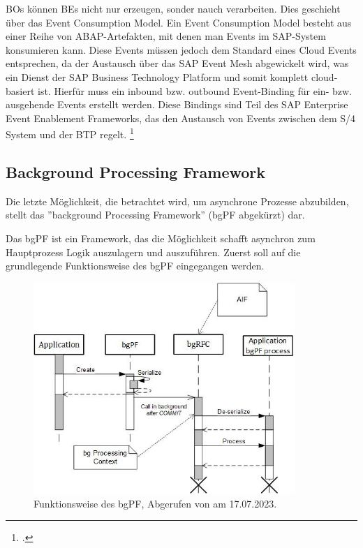 BOs können BEs nicht nur erzeugen, sonder nauch verarbeiten. Dies geschieht über das Event Consumption Model. Ein Event Consumption Model besteht aus einer Reihe von ABAP-Artefakten, mit denen man Events im SAP-System konsumieren kann. Diese Events müssen jedoch dem Standard eines Cloud Events entsprechen, da der Austausch über das SAP Event Mesh abgewickelt wird, was ein Dienst der SAP Business Technology Platform und somit komplett cloud-basiert ist. Hierfür muss ein inbound bzw. outbound Event-Binding für ein- bzw. ausgehende Events erstellt werden. Diese Bindings sind Teil des SAP Enterprise Event Enablement Frameworks, das den Austausch von Events zwischen dem S/4 System und der BTP regelt. \footcite[Vgl.][]{sap_creating_2022}

\subsection{Background Processing Framework}

Die letzte Möglichkeit, die betrachtet wird, um asynchrone Prozesse abzubilden, stellt das ''background Processing Framework'' (bgPF abgekürzt) dar.

Das bgPF ist ein Framework, das die Möglichkeit schafft asynchron zum Hauptprozess Logik auszulagern und auszuführen. Zuerst soll auf die grundlegende Funktionsweise des bgPF eingegangen werden.

\begin{figure}[H]
    \centering
    \includegraphics[height=8cm]{Bilder/bgPF_Schema.png}
    \caption[Funktionsweise des bgPF]{Funktionsweise des bgPF, Abgerufen von \cite{sap_bgpf_2023} am 17.07.2023.}
    \label{fig:iso_norm}
\end{figure}

